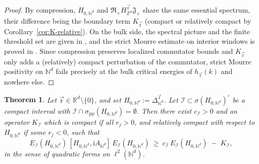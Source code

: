 \documentclass[10pt]{amsart}
\newcommand{\Z}{{\mathbb{Z}}}
\newcommand{\N}{{\mathbb{N}}}
\newcommand{\1}{{\mathbb{I}}}
\numberwithin{equation}{section}
\newtheorem{theorem}{Theorem}[section]%
\begin{document}
\begin{proof}
By compression,
$H_{0,\N^d}$ and $\mathfrak{R}_+ H_{\Z^d}^{\vec{\mathrm{r}}}\mathfrak{J}_+$ share the same essential spectrum,
their difference being the boundary term $K_{\vec{\mathrm{r}}}$ (compact or relatively
compact by Corollary~\ref{cor:K-relative}).
On the bulk side, the spectral picture and the finite threshold set are given
in \cite[Propostion 2.12]{At}, and the strict Mourre estimate on interior
windows is proved in \cite[Theorem~2.20]{At}.
Since compression preserves localized commutator bounds and $K_{\vec{\mathrm{r}}}$ only adds
a (relatively) compact perturbation of the commutator, strict Mourre positivity on
$\N^d$ fails precisely at the bulk critical energies of $h_{\vec{\mathrm{r}}}(k)$ and nowhere else.




\end{proof}

\begin{theorem}\label{thm:mourre_Nd}
Let $\vec{\mathrm{r}} \in \mathbb{R}^d \setminus \{0\}$, and set $H_{0,\N^d} := \Delta^{\vec{\mathrm{r}}}_{\N^d}$.
Let $\mathcal{I} \subset \sigma(H_{0,\N^d})^\circ$ be a compact interval with $\mathcal{I} \cap \sigma_{\mathrm{pp}}(H_{0,\N^d}) = \emptyset$. Then there exist $c_{\mathcal{I}} > 0$ and an operator $K_{\mathcal{I}}$ which is
compact if all $r_j > 0$, and relatively compact with respect to $H_{0,\N^d}$ if some $r_j < 0$, such that
\[
E_{\mathcal{I}}(H_{0,\N^d})\,[H_{0,\N^d}, \mathrm{i}A_{\N^d}]\,E_{\mathcal{I}}(H_{0,\N^d}) \ \ge \ c_{\mathcal{I}}\, E_{\mathcal{I}}(H_{0,\N^d}) \;-\; K_{\mathcal{I}},
\]
in the sense of quadratic forms on $\ell^2(\N^d)$.
\end{theorem}
\end{document}
